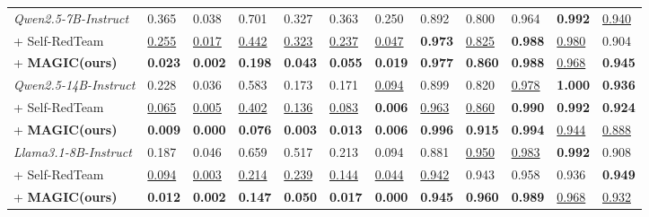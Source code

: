 \documentclass[11pt, letterpaper]{template}
\theoremstyle{plain}
\theoremstyle{definition}
\theoremstyle{remark}
\begin{document}
\begin{table}[t]
\begin{tabularx}{\textwidth}{l Y Y Y Y Y Y P{1.35cm} Y P{1.55cm} P{1.35cm} P{1.45cm}}
\textit{Qwen2.5-7B-Instruct} & 0.365 & 0.038 & 0.701 & 0.327 & 0.363 & 0.250 & 0.892 & 0.800 & 0.964 & \textbf{0.992} & \underline{0.940} \\
\quad + Self-RedTeam & \underline{0.255} & \underline{0.017} & \underline{0.442} & \underline{0.323} & \underline{0.237} & \underline{0.047} & \textbf{0.973} & \underline{0.825} & \textbf{0.988} & \underline{0.980} & 0.904 \\
\quad + \textbf{MAGIC(ours)} &
\textbf{0.023} &
\textbf{0.002} &
\textbf{0.198} &
\textbf{0.043} &
\textbf{0.055} &
\textbf{0.019} &
\textbf{0.977} &
\textbf{0.860} &
\textbf{0.988} &
\underline{0.968} &
\textbf{0.945} \\
\addlinespace[0.35em]

\textit{Qwen2.5-14B-Instruct} & 0.228 & 0.036 & 0.583 & 0.173 & 0.171 & \underline{0.094} & 0.899 & 0.820 & \underline{0.978} & \textbf{1.000} & \textbf{0.936} \\
\quad + Self-RedTeam & \underline{0.065} & \underline{0.005} & \underline{0.402} & \underline{0.136} & \underline{0.083} & \textbf{0.006} & \underline{0.963} & \underline{0.860} & \textbf{0.990} & \textbf{0.992} & \textbf{0.924} \\
\quad + \textbf{MAGIC(ours)} &
\textbf{0.009} &
\textbf{0.000} &
\textbf{0.076} &
\textbf{0.003} &
\textbf{0.013} &
\textbf{0.006} &
\textbf{0.996} &
\textbf{0.915} &
\textbf{0.994} &
\underline{0.944} &
\underline{0.888} \\
\addlinespace[0.35em]

\textit{Llama3.1-8B-Instruct} & 0.187 & 0.046 & 0.659 & 0.517 & 0.213 & 0.094 & 0.881 & \underline{0.950} & \underline{0.983} & \textbf{0.992} & 0.908 \\
\quad + Self-RedTeam & \underline{0.094} & \underline{0.003} & \underline{0.214} & \underline{0.239} & \underline{0.144} & \underline{0.044} & \underline{0.942} & 0.943 & 0.958 & 0.936 & \textbf{0.949} \\
\quad + \textbf{MAGIC(ours)} &
\textbf{0.012} &
\textbf{0.002} &
\textbf{0.147} &
\textbf{0.050} &
\textbf{0.017} &
\textbf{0.000} &
\textbf{0.945} &
\textbf{0.960} &
\textbf{0.989} &
\underline{0.968} &
\underline{0.932} \\
\bottomrule
\end{tabularx}
\end{table}
\end{document}
